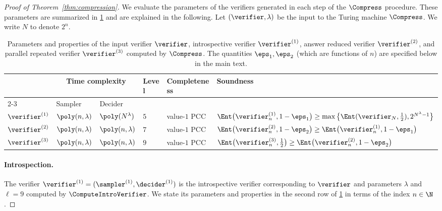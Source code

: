 \begin{proof}[Proof of Theorem~\ref{thm:compression}]
  We evaluate the parameters of the verifiers generated in each step of the
  $\Compress$ procedure. 
  These parameters are summarized in \cref{tab:params} and are explained in the
  following. Let $(\verifier, \lambda)$ be the input to the Turing machine $\Compress$. We write $N$ to denote $2^n$. 

  \begin{table}[!htb]
    \centering
    \footnotesize
    \vspace{1em}
    \begin{tabularx}{\linewidth}{b{.03\linewidth}m{.1\linewidth}m{.1\linewidth}
      m{.03\linewidth}m{.1\linewidth}m{.5\linewidth}}
    \toprule \multirow{2}[2]{.03\linewidth}{} & \multicolumn{2}{c}{Time
      complexity} & \multirow{2}[2]{.1\linewidth}{Level} &
    \multirow{2}[2]{.1\linewidth}{Completeness}
    & \multirow{2}[2]{.1\linewidth}{Soundness}\\
    \cmidrule(lr){2-3}
    & Sampler & Decider\\
    \midrule $\verifier^{(1)}$ & $\poly(n, \lambda)$ & $\poly(N^\lambda)$ & $5$
    & value-$1$ PCC & $\Ent \big(
    \verifier_n^{(1)}, 1 - \eps_1 \big) \geq \max \big
    \{\Ent(\verifier_N, \frac{1}{2}), 2^{N^\lambda - 1} \big \}$\\
    \midrule $\verifier^{(2)}$ & $\poly(n, \lambda)$ & $\poly(n,
    \lambda)$ & $7$ & value-$1$ PCC &
    $\Ent \bigl(
    \verifier_n^{(2)}, 1 - \eps_2 \bigr) \geq \Ent \bigl(\verifier_n^{(1)}, 1 - \eps_1 \bigr)$\\
    \midrule $\verifier^{(3)}$ & $\poly(n, \lambda)$ & $\poly(n,
    \lambda)$ & $9$ & value-$1$ PCC &
    $\Ent \bigl(
    \verifier_n^{(3)}, \frac{1}{2} \bigr) \geq \Ent \bigl(\verifier_n^{(2)}, 1 - \eps_2 \bigr)$\\
    \bottomrule
    \end{tabularx}
    \caption{Parameters and properties of the input verifier $\verifier$,
      introspective verifier $\verifier^{(1)}$, answer reduced verifier
      $\verifier^{(2)}$, and parallel repeated verifier $\verifier^{(3)}$
      computed by $\Compress$.
      The quantities $\eps_1,\eps_2$ (which are functions of $n$) are specified below in the main text.}
\label{tab:params}
  \end{table}







  
  \paragraph{Introspection.}
  The verifier $\verifier^{(1)} = (\sampler^{(1)}, \decider^{(1)})$ is the
  introspective verifier corresponding to $\verifier$ and parameters $\lambda$
  and $\ell = 9$ computed by $\ComputeIntroVerifier$.
  We state its parameters and properties in the second row of \cref{tab:params}
  in terms of the index $n \in \N$.



\end{proof}
